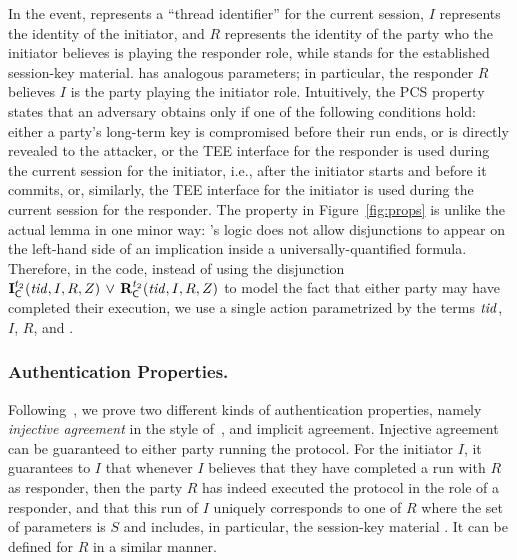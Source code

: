 In the \mIComplete{} event, \mTID{} represents a ``thread identifier'' for the
current session, $I$ represents the identity of the initiator,
and $R$ represents the identity of the party who the initiator believes is
playing the responder role, while \mSessKey{} stands for the established
session-key material.
%
\mRComplete{} has analogous parameters; in particular, the responder $R$
believes $I$ is the party playing the initiator role.
%
Intuitively, the PCS property states that an adversary obtains \mSessKey{}
only if one of the following conditions hold: either a party's long-term key
is compromised before their run ends, or \mSessKey{} is directly revealed to
the attacker, or the TEE interface for the responder is used during the current
session for the initiator, i.e., after the initiator starts and before it
commits, or, similarly, the TEE interface for the initiator is used during the
current session for the responder.
%
The property in Figure~\ref{fig:props} is unlike the actual \mTamarin{} lemma
in one minor way: \mTamarin's logic does not allow disjunctions to appear on
the left-hand side of an implication inside a universally-quantified formula.
%
Therefore, in the \mTamarin{} code, instead of using the disjunction
$\mathbf{I}_{\textsf{C}}^{t_2}(\mathit{tid}, I, R, Z)\, \lor\,
\mathbf{R}_{\textsf{C}}^{t_2}(\mathit{tid}, I, R, Z)$
to model the fact that either party may have completed their execution, we use
a single action parametrized by the terms $\mathit{tid}$, $I$, $R$, and \mSessKey.

\subsubsection{Authentication Properties.}
\label{sec:authenticationDef}
Following~\cite{Norr21}, we prove two different kinds of authentication
properties, namely \emph{injective agreement} in the style
of~\cite{DBLP:conf/csfw/Lowe97a}, and implicit agreement.
%
Injective agreement can be guaranteed to either party running the protocol.
%
For the initiator $I$, it guarantees to $I$ that whenever $I$ believes that
they have completed a run with $R$ as responder, then the party $R$ has 
indeed
executed the protocol in the role of a responder, and that this run of $I$
uniquely corresponds to one of $R$ where the set of parameters is $S$ and
includes, in particular, the session-key material \mSessKey{}.
%
It can be defined for $R$ in a similar manner.


